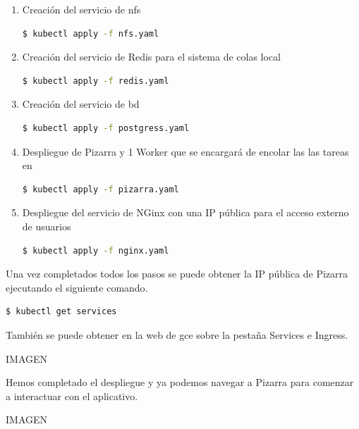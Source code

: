 \documentclass[11pt,spanish,listoffigures,listoftables]{tfgetsinf}
\begin{document}
\begin{enumerate}
	\item Creación del servicio de \acrshort{nfs}
	
	\begin{lstlisting}[language=bash]	
	$ kubectl apply -f nfs.yaml
	\end{lstlisting}
	
	\item Creación del servicio de Redis para el sistema de colas local
	
	\begin{lstlisting}[language=bash]	
	$ kubectl apply -f redis.yaml
	\end{lstlisting}
	
	\item Creación del servicio de \acrlong{bd}
	
	\begin{lstlisting}[language=bash]	
	$ kubectl apply -f postgress.yaml
	\end{lstlisting}
	
	\item Despliegue de Pizarra y 1 Worker que se encargará de encolar las las \Gls{tarea}s en \kahan
	
	\begin{lstlisting}[language=bash]	
	$ kubectl apply -f pizarra.yaml
	\end{lstlisting}
	
	\item Despliegue del servicio de NGinx con una IP pública para el acceso externo de usuarios
	
	\begin{lstlisting}[language=bash]	
	$ kubectl apply -f nginx.yaml
	\end{lstlisting}
	
\end{enumerate}

Una vez completados todos los pasos se puede obtener la IP pública de Pizarra ejecutando el siguiente comando.

\begin{lstlisting}[language=bash]	
$ kubectl get services
\end{lstlisting}

También se puede obtener en la web de \acrshort{gce} sobre la pestaña Services e Ingress.

IMAGEN

Hemos completado el despliegue y ya podemos navegar a Pizarra para comenzar a interactuar con el aplicativo.

IMAGEN
\end{document}
